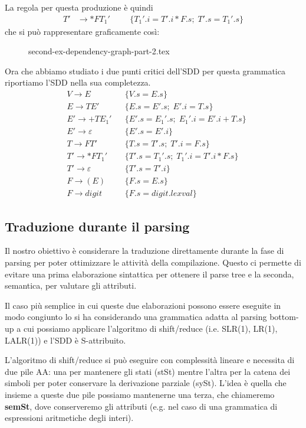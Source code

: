 \documentclass[class=book, crop=false, oneside, 12pt]{standalone}
\begin{document}
La regola per questa produzione è quindi
\begin{align*}
    T' &\to *FT_1' & & &\{T_1'.i = T'.i * F.s; \; T'.s = T_1'.s\}
\end{align*}
che si può rappresentare graficamente così:
\begin{figure}[H]
    \centering
    {second-ex-dependency-graph-part-2.tex}
\end{figure}
Ora che abbiamo studiato i due punti critici dell'SDD per questa grammatica riportiamo l'SDD nella sua completezza.
\begin{align*}
    &V  \to E & &\{V.s = E.s\} \\
    &E  \to TE' & &\{E.s = E'.s; \; E'.i = T.s\} \\
    &E' \to +TE_1' & &\{E'.s = E_1'.s; \; E_1'.i = E'.i + T.s\} \\
    &E' \to \varepsilon & &\{E'.s = E'.i\} \\
    &T  \to FT' & &\{T.s = T'.s; \; T'.i = F.s\} \\
    &T' \to *FT_1' & &\{T'.s = T_1'.s; \; T_1'.i = T'.i * F.s\} \\
    &T' \to \varepsilon & &\{T'.s = T'.i\} \\
    &F  \to (E) & &\{F.s = E.s\} \\
    &F  \to digit & &\{F.s = digit.lexval\}
\end{align*}

\subsection{Traduzione durante il parsing}

Il nostro obiettivo è considerare la traduzione direttamente durante la fase di parsing per poter ottimizzare le attività della compilazione. Questo ci permette di evitare una prima elaborazione sintattica per ottenere il parse tree e la seconda, semantica, per valutare gli attributi.

Il caso più semplice in cui queste due elaborazioni possono essere eseguite in modo congiunto lo si ha considerando una grammatica adatta al parsing bottom-up a cui possiamo applicare l'algoritmo di shift/reduce (i.e. SLR(1), LR(1), LALR(1)) e l'SDD è S-attribuito.

L'algoritmo di shift/reduce si può eseguire con complessità lineare e necessita di due pile AA: una per mantenere gli stati (stSt) mentre l'altra per la catena dei simboli per poter conservare la derivazione parziale (sySt). L'idea è quella che insieme a queste due pile possiamo mantenerne una terza, che chiameremo \textbf{semSt}, dove conserveremo gli attributi (e.g. nel caso di una grammatica di espressioni aritmetiche degli interi).
\end{document}
